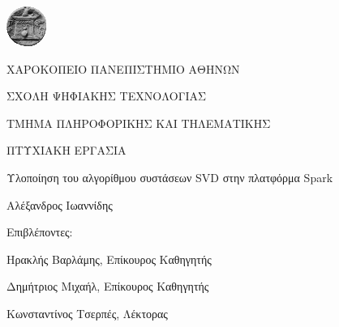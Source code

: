 \documentclass{report}
\begin{document}
\vspace{5mm}

\begin{center}
\includegraphics{hualogo}
\end{center}

\vspace{5mm}

\begin{center}
ΧΑΡΟΚΟΠΕΙΟ ΠΑΝΕΠΙΣΤΗΜΙΟ ΑΘΗΝΩΝ
\end{center}

\vspace{5mm}

\begin{center}
ΣΧΟΛΗ ΨΗΦΙΑΚΗΣ ΤΕΧΝΟΛΟΓΙΑΣ
\end{center}
\begin{center}
ΤΜΗΜΑ ΠΛΗΡΟΦΟΡΙΚΗΣ ΚΑΙ ΤΗΛΕΜΑΤΙΚΗΣ
\end{center}

\vspace{10mm}

\begin{center}
ΠΤΥΧΙΑΚΗ ΕΡΓΑΣΙΑ
\end{center}

\begin{center}
Υλοποίηση του αλγορίθμου συστάσεων
\textlatin{SVD} στην πλατφόρμα \textlatin{Spark}
\end{center}

\vspace{5mm}

\begin{center}
Αλέξανδρος Ιωαννίδης
\end{center}

\vspace{5mm}

\begin{center}
Επιβλέποντες: 
\end{center}


\begin{center}
Ηρακλής Βαρλάμης, Επίκουρος Καθηγητής \end{center}


\begin{center}
Δημήτριος Μιχαήλ, Επίκουρος Kαθηγητής
\end{center}


\begin{center}
Κωνσταντίνος Τσερπές, Λέκτορας
\end{center}
\end{document}

